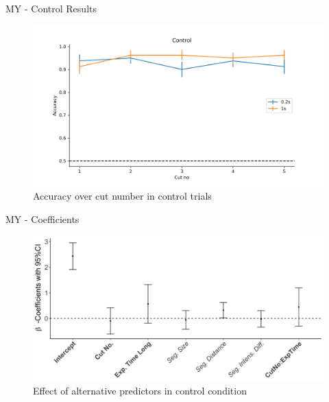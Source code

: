\documentclass[10pt,xcolor=svgnames]{beamer} %
\begin{document}
\begin{frame}{MY - Control Results}
    \begin{figure}
        \hspace*{-1cm} 
        \centering
        \includegraphics[width = 1.1\textwidth]{pictures/my_control.png}
        \caption{Accuracy over cut number in control trials}
        \label{fig:my_cont}
    \end{figure}    
\end{frame}



\begin{frame}{MY - Coefficients}
    \begin{figure}
        \hspace*{-1cm} 
        \centering
        \includegraphics[width = 1.1\textwidth]{pictures/my_cont_coefficients_othrs_tgthr.png}
        \caption{Effect of alternative predictors in control condition}
        \label{fig:my_cont_coeffs_othrs}
    \end{figure}    
\end{frame}
\end{document}
